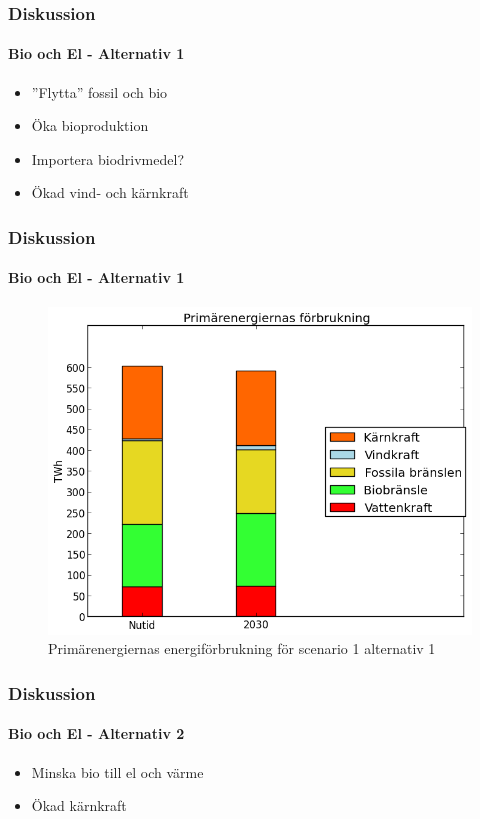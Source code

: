 \documentclass{beamer}
\begin{document}
\begin{frame}
	\frametitle{Diskussion}
	\framesubtitle{Bio och El - Alternativ 1}
	\begin{itemize}
		\item{''Flytta'' fossil och bio}
		\item{Öka bioproduktion}
		\item{Importera biodrivmedel?}
		\item{Ökad vind- och kärnkraft}
	\end{itemize}
\end{frame}

\begin{frame}
	\frametitle{Diskussion}
	\framesubtitle{Bio och El - Alternativ 1}
	\begin{figure}[h!]
       \centering
       \includegraphics[scale=0.5]{scen1a1energidiagram.png}
       \caption{Primärenergiernas energiförbrukning för scenario 1 alternativ 1}
       \label{fig:scen1a1energidiagram}
	\end{figure}
\end{frame}

\begin{frame}
	\frametitle{Diskussion}
	\framesubtitle{Bio och El - Alternativ 2}
	\begin{itemize}
		\item{Minska bio till el och värme}
		\item{Ökad kärnkraft}
	\end{itemize}
\end{frame}
\end{document}
